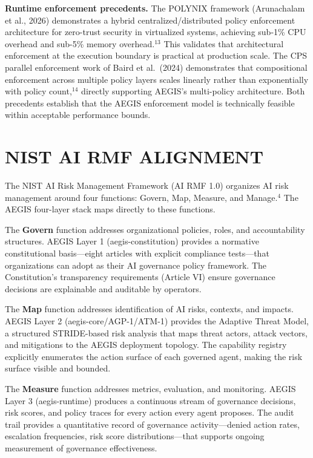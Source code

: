 \documentclass{IEEEcsmag}
\begin{document}
{\bf Runtime enforcement precedents.} The POLYNIX framework (Arunachalam et al., 2026) demonstrates a hybrid centralized/distributed policy enforcement architecture for zero-trust security in virtualized systems, achieving sub-1\% CPU overhead and sub-5\% memory overhead.$^{13}$ This validates that architectural enforcement at the execution boundary is practical at production scale. The CPS parallel enforcement work of Baird et al.\ (2024) demonstrates that compositional enforcement across multiple policy layers scales linearly rather than exponentially with policy count,$^{14}$ directly supporting AEGIS's multi-policy architecture. Both precedents establish that the AEGIS enforcement model is technically feasible within acceptable performance bounds.

\section{NIST AI RMF ALIGNMENT}

The NIST AI Risk Management Framework (AI RMF 1.0) organizes AI risk management around four functions: Govern, Map, Measure, and Manage.$^{4}$ The AEGIS four-layer stack maps directly to these functions.

The {\bf Govern} function addresses organizational policies, roles, and accountability structures. AEGIS Layer 1 (aegis-constitution) provides a normative constitutional basis---eight articles with explicit compliance tests---that organizations can adopt as their AI governance policy framework. The Constitution's transparency requirements (Article VI) ensure governance decisions are explainable and auditable by operators.

The {\bf Map} function addresses identification of AI risks, contexts, and impacts. AEGIS Layer 2 (aegis-core/AGP-1/ATM-1) provides the Adaptive Threat Model, a structured STRIDE-based risk analysis that maps threat actors, attack vectors, and mitigations to the AEGIS deployment topology. The capability registry explicitly enumerates the action surface of each governed agent, making the risk surface visible and bounded.

The {\bf Measure} function addresses metrics, evaluation, and monitoring. AEGIS Layer 3 (aegis-runtime) produces a continuous stream of governance decisions, risk scores, and policy traces for every action every agent proposes. The audit trail provides a quantitative record of governance activity---denied action rates, escalation frequencies, risk score distributions---that supports ongoing measurement of governance effectiveness.
\end{document}
